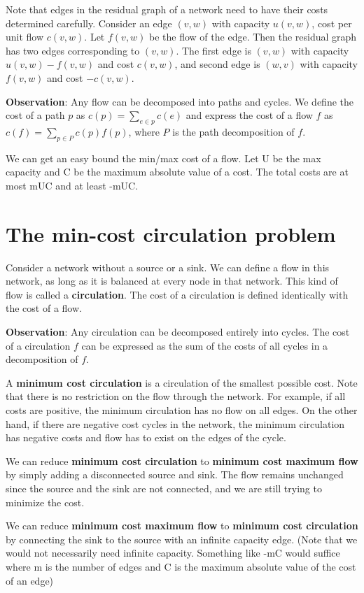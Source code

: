 \documentclass{article}
\begin{document}
Note that edges in the residual graph of a network need to have their costs determined carefully.  Consider an edge $(v, w)$ with capacity $u(v, w)$, cost per unit flow $c(v, w)$.  Let $f(v, w)$ be the flow of the edge.  Then the residual graph has two edges corresponding to $(v, w)$. The first edge is $(v, w)$ with capacity $u(v, w) - f(v, w)$ and cost $c(v, w)$, and second edge is $(w, v)$ with capacity $f(v, w)$ and cost $-c(v, w)$. 

\textbf{Observation}:
Any flow can be decomposed into paths and cycles.  We define the cost of a path $p$ as $c(p) = \sum_{e\in p} c(e)$ and express the cost of a flow $f$ as $c(f) = \sum_{p\in P} c(p)f(p)$, where $P$ is the path decomposition of $f$. 

We can get an easy bound the min/max cost of a flow.  Let U be the max capacity and C be the maximum absolute value of a cost.  The total costs are at most mUC and at least -mUC.  

\section{The min-cost circulation problem}

Consider a network without a source or a sink. We can define a flow in this network, as long as it is balanced at every node in that network. This kind of flow is called a {\bf circulation}. The cost of a circulation is defined identically with the cost of a flow. 

\textbf{Observation}:
Any circulation can be decomposed entirely into cycles. The cost of a circulation $f$ can be expressed as the sum of the costs of all cycles in a decomposition of $f$. 

A {\bf minimum cost circulation} is a circulation of the smallest possible cost. Note that there is no restriction on the flow through the network. For example, if all costs are positive, the minimum circulation has no flow on all edges. On the other hand, if there are negative cost cycles in the network, the minimum circulation has negative costs and flow has to exist on the edges of the cycle.

We can reduce {\bf minimum cost circulation} to {\bf minimum cost maximum flow} by simply adding a disconnected source and sink.  The flow remains unchanged since the source and the sink are not connected, and we are still trying to minimize the cost.  

We can reduce {\bf minimum cost maximum flow} to {\bf minimum cost circulation} by connecting the sink to the source with an infinite capacity edge.  (Note that we would not necessarily need infinite capacity.  Something like -mC would suffice where m is the number of edges and C is the maximum absolute value of the cost of an edge)  
\end{document}
